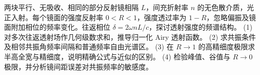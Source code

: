 两块平行、无吸收、相同的部分反射镜相隔 \(L\)，间充折射率 \(n\) 的无色散介质，光正入射。每个镜面的强度反射率 \(0<R<1\)，强度透过率为 \(1-R\)，忽略偏振及镜面附加相位的频率变化。往返相位 \(\delta=2\omega nL/c\)，探讨透射强度的频谱结构。
(1) 对多次往返透射场作几何级数求和，推导归一化 Airy 透射函数。
(2) 求共振条件及相邻共振角频率间隔和普通频率自由光谱区。
(3) 在 \(R\to1\) 的高精细度极限求半高全宽与精细度，说明精确公式与近似的区别。
(4) 检验峰值、谷值与 \(R\to0\) 极限，并分析镜间距误差对共振频率的敏感度。
